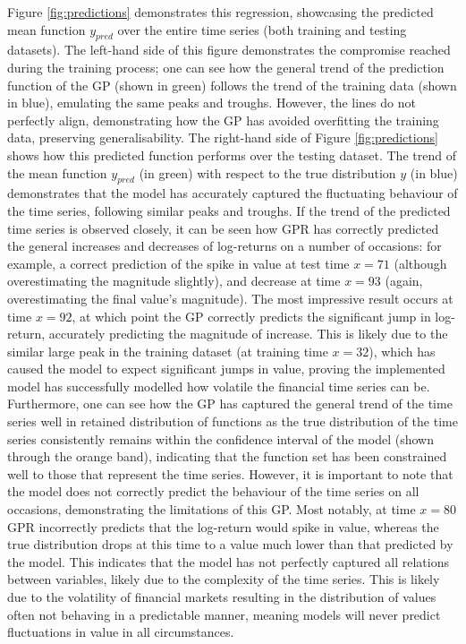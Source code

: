 \documentclass[a4paper, 11pt]{article}
\begin{document}
    Figure \ref{fig:predictions} demonstrates this regression, showcasing the predicted mean function $y_{pred}$ over the entire time series (both training and testing datasets). The left-hand side of this figure demonstrates the compromise reached during the training process; one can see how the general trend of the prediction function of the GP (shown in green) follows the trend of the training data (shown in blue), emulating the same peaks and troughs. However, the lines do not perfectly align, demonstrating how the GP has avoided overfitting the training data, preserving generalisability. The right-hand side of Figure \ref{fig:predictions} shows how this predicted function performs over the testing dataset. The trend of the mean function $y_{pred}$ (in green) with respect to the true distribution $y$ (in blue) demonstrates that the model has accurately captured the fluctuating behaviour of the time series, following similar peaks and troughs. If the trend of the predicted time series is observed closely, it can be seen how GPR has correctly predicted the general increases and decreases of log-returns on a number of occasions: for example, a correct prediction of the spike in value at test time $x=71$ (although overestimating the magnitude slightly), and decrease at time $x=93$ (again, overestimating the final value's magnitude). The most impressive result occurs at time $x=92$, at which point the GP correctly predicts the significant jump in log-return, accurately predicting the magnitude of increase. This is likely due to the similar large peak in the training dataset (at training time $x=32$), which has caused the model to expect significant jumps in value, proving the implemented model has successfully modelled how volatile the financial time series can be. Furthermore, one can see how the GP has captured the general trend of the time series well in retained distribution of functions as the true distribution of the time series consistently remains within the confidence interval of the model (shown through the orange band), indicating that the function set has been constrained well to those that represent the time series. However, it is important to note that the model does not correctly predict the behaviour of the time series on all occasions, demonstrating the limitations of this GP. Most notably, at time $x=80$ GPR incorrectly predicts that the log-return would spike in value, whereas the true distribution drops at this time to a value much lower than that predicted by the model. This indicates that the model has not perfectly captured all relations between variables, likely due to the complexity of the time series. This is likely due to the volatility of financial markets resulting in the distribution of values often not behaving in a predictable manner, meaning models will never predict fluctuations in value in all circumstances.
\end{document}
